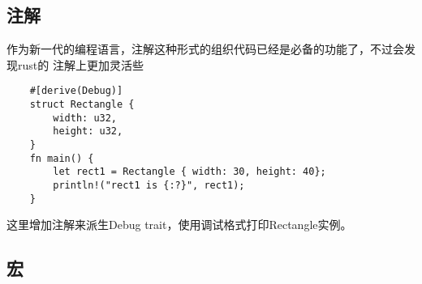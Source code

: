 \subsection{注解}
作为新一代的编程语言，注解这种形式的组织代码已经是必备的功能了，不过会发现rust的
注解上更加灵活些
\begin{lstlisting}
    #[derive(Debug)]
    struct Rectangle {
        width: u32,
        height: u32,
    } 
    fn main() {
        let rect1 = Rectangle { width: 30, height: 40};
        println!("rect1 is {:?}", rect1);
    }
\end{lstlisting}
这里增加注解来派生Debug trait，使用调试格式打印Rectangle实例。

\subsection{宏}
